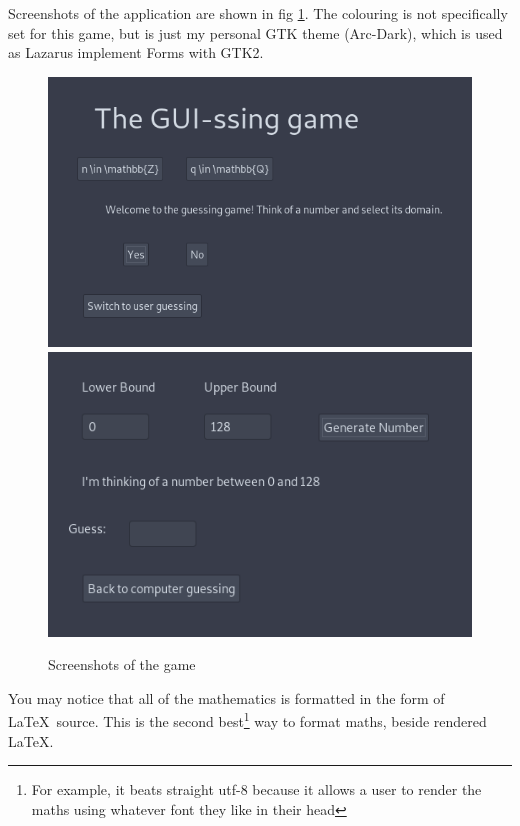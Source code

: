 \documentclass[a4paper,11pt]{article}
\begin{document}
    Screenshots of the application are shown in fig \ref{pic:app}. The colouring
    is not specifically set for this game, but is just my personal GTK theme
    (Arc-Dark), which is used as Lazarus implement Forms with GTK2.

\begin{figure}[H]
\begin{center}
\includegraphics[height=0.2\textheight]{win_screenshot_20180611_202749.png}
\includegraphics[height=0.2\textheight]{win_screenshot_20180611_202757.png}
\end{center}
\caption{Screenshots of the game}\label{pic:app}
\end{figure}

    You may notice that all of the mathematics is formatted in the form of
    \LaTeX\ source. This is the second best\footnote{For example, it beats
    straight utf-8 because it allows a user to render the maths using whatever
    font they like in their head} way to format maths, beside rendered
    \LaTeX.
\end{document}
